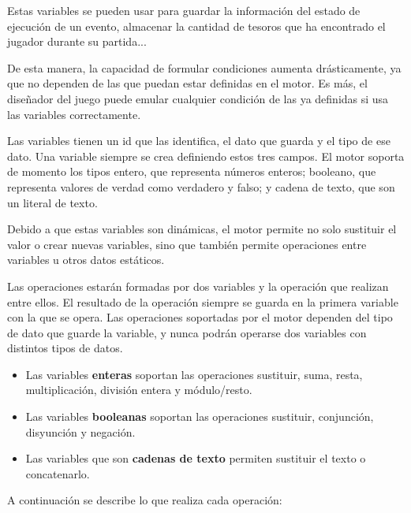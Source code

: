 Estas variables se pueden usar para guardar la información del estado de ejecución de un evento, almacenar la cantidad de tesoros que ha encontrado el jugador durante su partida...

De esta manera, la capacidad de formular condiciones aumenta drásticamente, ya que no dependen de las que puedan estar definidas en el motor. Es más, el diseñador del juego puede emular cualquier condición de las ya definidas si usa las variables correctamente.

Las variables tienen un id que las identifica, el dato que guarda y el tipo de ese dato. Una variable siempre se crea definiendo estos tres campos.
El motor soporta de momento los tipos entero, que representa números enteros; booleano, que representa valores de verdad como verdadero y falso; y cadena de texto, que son un literal de texto.

Debido a que estas variables son dinámicas, el motor permite no solo sustituir el valor o crear nuevas variables, sino que también permite operaciones entre variables u otros datos estáticos.

Las operaciones estarán formadas por dos variables y la operación que realizan entre ellos. El resultado de la operación siempre se guarda en la primera variable con la que se opera. Las operaciones soportadas por el motor dependen del tipo de dato que guarde la variable, y nunca podrán operarse dos variables con distintos tipos de datos.

\begin{itemize}
	\item Las variables \textbf{enteras} soportan las operaciones sustituir, suma, resta, multiplicación, división entera y módulo/resto.
	\item Las variables \textbf{booleanas} soportan las operaciones sustituir, conjunción, disyunción y negación.
	\item Las variables que son \textbf{cadenas de texto} permiten sustituir el texto o concatenarlo.
\end{itemize}

A continuación se describe lo que realiza cada operación:

